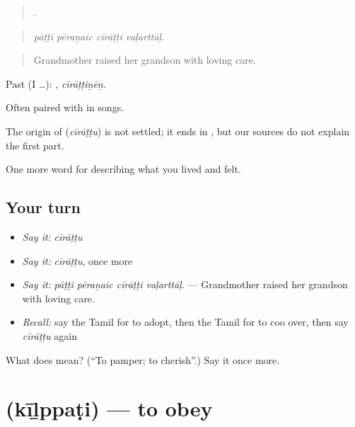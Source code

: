 \begin{quote}
   .
\end{quote}

\begin{quote}
\emph{pāṭṭi pēraṉaic cīrāṭṭi vaḷarttāḷ.}
\end{quote}

\begin{quote}
Grandmother raised her grandson with loving care.
\end{quote}

Past (I …): , \emph{cīrāṭṭiṉēṉ}.

Often paired with  in songs.

\begin{cousinweb}
The origin of \textbf{} (\emph{cīrāṭṭu}) is not settled; it ends in , but our sources do not explain the first part.
\end{cousinweb}

\begin{grammarlens}[title={What you've built}]
One more word for describing what you lived and felt.
\end{grammarlens}

\subsection*{Your turn}
\begin{itemize}
\raggedright
  \item \emph{Say it:} \emph{cīrāṭṭu}
  \item \emph{Say it:} \emph{cīrāṭṭu}, once more
  \item \emph{Say it:} \emph{pāṭṭi pēraṉaic cīrāṭṭi vaḷarttāḷ.} — Grandmother raised her grandson with loving care.
  \item \emph{Recall:} say the Tamil for to adopt, then the Tamil for to coo over, then say \emph{cīrāṭṭu} again
\end{itemize}

\begin{tcolorbox}[breakable,colback=teal!4,colframe=teal!35!black,title={Before you move on}]
What does  mean? (\textquotedblleft{}To pamper; to cherish\textquotedblright{}.) Say it once more.
\end{tcolorbox}
\section[\texorpdfstring{\ta{கீழ்ப்படி} (kīḻppaṭi)}{கீழ்ப்படி (kīḻppaṭi)}]{ (kīḻppaṭi) — to obey}

